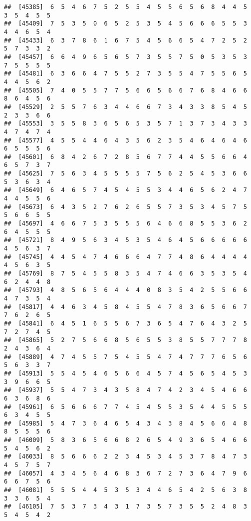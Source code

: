 \documentclass[
]{book}
\begin{document}
\begin{verbatim}
##  [45385]  6  5  4  6  7  5  2  5  5  4  5  5  6  5  6  8  4  4  5  3  5  4  5  5
##  [45409]  7  5  3  5  0  6  5  2  5  3  5  4  5  6  6  6  5  5  3  4  4  6  5  4
##  [45433]  6  3  7  8  6  1  6  7  5  4  5  6  6  5  4  7  2  5  2  5  7  3  3  2
##  [45457]  6  6  4  9  6  5  6  5  7  3  5  5  7  5  0  5  3  5  3  7  5  5  5  5
##  [45481]  6  3  6  6  4  7  5  5  2  7  3  5  5  4  7  5  5  6  5  4  4  5  6  2
##  [45505]  7  4  0  5  5  7  7  5  6  6  5  6  6  7  6  8  4  6  6  8  6  4  5  6
##  [45529]  2  5  5  7  6  3  4  4  6  6  7  3  4  3  3  8  5  4  5  2  3  3  6  6
##  [45553]  3  5  5  8  3  6  5  6  5  3  5  7  1  3  7  3  4  3  3  4  7  4  7  4
##  [45577]  4  5  5  4  4  6  4  3  5  6  2  3  5  4  6  4  6  4  6  6  5  5  5  6
##  [45601]  6  8  4  2  6  7  2  8  5  6  7  7  4  4  5  5  6  6  4  6  5  7  3  7
##  [45625]  7  5  6  3  4  5  5  5  5  7  5  6  2  5  4  5  3  6  6  5  3  6  3  4
##  [45649]  6  4  6  5  7  4  5  4  5  5  3  4  4  6  5  6  2  4  7  4  4  5  5  6
##  [45673]  6  4  3  5  2  7  6  2  6  5  5  7  3  5  3  4  5  7  5  5  6  6  5  5
##  [45697]  4  6  6  7  5  3  5  5  5  6  4  6  6  8  5  5  3  6  2  6  4  5  5  5
##  [45721]  8  4  9  5  6  3  4  5  3  5  4  6  4  5  6  6  6  6  6  4  5  6  3  7
##  [45745]  4  4  5  4  7  4  6  6  6  4  7  7  4  8  6  4  4  4  4  4  5  6  3  5
##  [45769]  8  7  5  4  5  5  8  3  5  4  7  4  6  6  3  5  3  5  4  6  2  4  4  8
##  [45793]  4  8  5  6  5  6  4  4  4  0  8  3  5  4  2  5  5  6  6  4  7  3  5  4
##  [45817]  4  4  6  3  4  5  8  4  5  5  4  7  8  3  6  5  6  6  7  7  6  2  6  5
##  [45841]  6  4  5  1  6  5  5  6  7  3  6  5  4  7  6  4  3  2  5  7  2  7  4  5
##  [45865]  5  2  7  5  6  6  8  5  6  5  5  3  8  5  5  7  7  7  8  2  4  3  6  4
##  [45889]  4  7  4  5  5  7  5  4  5  5  4  7  4  7  7  7  6  5  6  5  6  3  3  7
##  [45913]  5  5  4  5  4  6  5  6  6  4  5  7  4  5  6  5  4  5  3  3  9  6  6  5
##  [45937]  5  5  4  7  3  4  3  5  8  4  7  4  2  3  4  5  4  6  6  6  3  6  8  6
##  [45961]  6  5  6  6  6  7  7  4  5  4  5  5  3  5  4  4  5  5  5  6  3  4  5  5
##  [45985]  5  4  7  3  6  4  6  5  4  3  4  3  8  4  5  6  6  4  8  8  5  5  5  6
##  [46009]  5  8  3  6  5  6  6  8  2  6  5  4  9  3  6  5  4  6  6  5  4  5  6  2
##  [46033]  8  5  6  6  6  2  2  3  4  5  3  4  5  3  7  8  4  7  3  4  5  7  5  7
##  [46057]  4  3  4  5  6  4  6  8  3  6  7  2  7  3  6  4  7  9  6  6  6  7  5  6
##  [46081]  5  5  5  4  4  5  3  5  3  4  4  6  5  4  2  5  6  3  8  3  3  6  5  4
##  [46105]  7  5  3  7  3  4  3  1  7  3  5  7  3  5  5  2  4  8  3  5  4  5  4  2

\end{verbatim}
\end{document}
